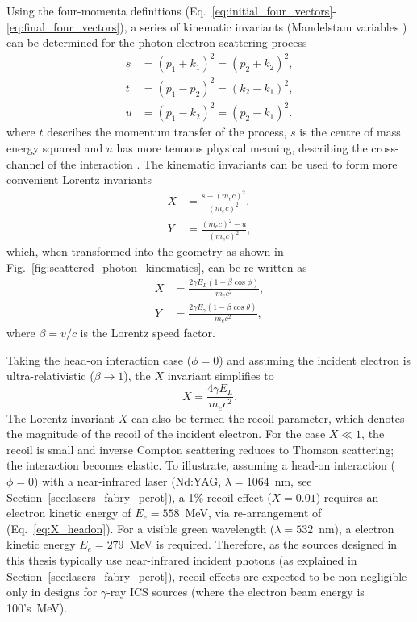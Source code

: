 \documentclass[../main.tex]{subfiles}
\begin{document}
Using the four-momenta definitions (Eq.~\ref{eq:initial_four_vectors}-\ref{eq:final_four_vectors}), a  series of kinematic invariants (Mandelstam variables \cite{mandelstam1958determination}) can be determined for the photon-electron scattering process \cite{berestetskii1982quantum}
\begin{align}
s &= \left(p_{1}+k_{1}\right)^{2} = \left(p_{2}+k_{2}\right)^{2},
\label{eq:s_Mandelstam} \\
t &= \left(p_{1}-p_{2}\right)^{2} = \left(k_{2}-k_{1}\right)^{2},
\label{eq:t_Mandelstam} \\
u &= \left(p_{1}-k_{2}\right)^{2} = \left(p_{2}-k_{1}\right)^{2}.
\label{eq:u_Mandelstam}
\end{align}
where $t$ describes the momentum transfer of the process, $s$ is the centre of mass energy squared and $u$ has more tenuous physical meaning, describing the cross-channel of the interaction \cite{berestetskii1982quantum}. The kinematic invariants can be used to form more convenient Lorentz invariants
\begin{align}
X &= \frac{s-\left(m_{e}c\right)^{2}}{\left(m_{e}c\right)^{2}},
\label{eq:X_Mandelstam} \\
Y &= \frac{\left(m_{e}c\right)^{2}-u}{\left(m_{e}c\right)^{2}},
\label{eq:Y_Mandelstam}
\end{align}
which, when transformed into the geometry as shown in Fig.~\ref{fig:scattered_photon_kinematics}, can be re-written as
\begin{align}
X &= \frac{2\gamma E_{L}\left(1+\beta\cos\phi\right)}{m_{e}c^{2}},
\label{eq:X_geometry} \\
Y &= \frac{2\gamma E_{\gamma}\left(1-\beta\cos\theta\right)}{m_{e}c^{2}},
\label{eq:Y_geometry}
\end{align}
where $\beta = v/c$ is the Lorentz speed factor.

Taking the head-on interaction case ($\phi = 0$) and assuming the incident electron is ultra-relativistic ($\beta \rightarrow 1$), the $X$ invariant simplifies to 
\begin{equation}
X = \frac{4\gamma E_{L}}{m_{e}c^{2}}.
\label{eq:X_headon}
\end{equation}
The Lorentz invariant $X$ can also be termed the recoil parameter, which denotes the magnitude of the recoil of the incident electron. For the case $X \ll 1$, the recoil is small and inverse Compton scattering reduces to Thomson scattering; the interaction becomes elastic. To illustrate, assuming a head-on interaction ($\phi=0$) with a near-infrared laser (Nd:YAG, $\lambda = 1064$~\si{\nano\meter}, see Section~\ref{sec:lasers_fabry_perot}), a 1\% recoil effect ($X = 0.01$) requires an electron kinetic energy of $E_{e} = 558$~\si{\mega\electronvolt}, via re-arrangement of (Eq.~\ref{eq:X_headon}). For a visible green wavelength ($\lambda = 532$~\si{\nano\meter}), a electron kinetic energy $E_{e} = 279$~\si{\mega\electronvolt} is required. Therefore, as the sources designed in this thesis typically use near-infrared incident photons (as explained in Section~\ref{sec:lasers_fabry_perot}), recoil effects are expected to be non-negligible only in designs for $\gamma$-ray ICS sources (where the electron beam energy is 100's~\si{\mega\electronvolt}).   
\end{document}

